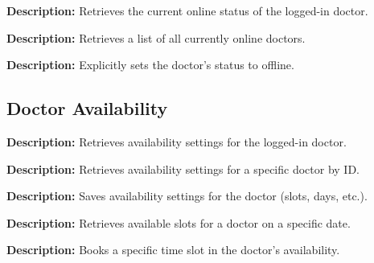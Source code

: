 \documentclass{article}
\begin{document}
\begin{tcolorbox}[title=\textcolor{accent}{GET} /api/doctor-status/status]
\textbf{Description:} Retrieves the current online status of the logged-in doctor.
\end{tcolorbox}

\begin{tcolorbox}[title=\textcolor{accent}{GET} /api/doctor-status/online-doctors]
\textbf{Description:} Retrieves a list of all currently online doctors.
\end{tcolorbox}

\begin{tcolorbox}[title=\textcolor{accent}{POST} /api/doctor-status/set-offline]
\textbf{Description:} Explicitly sets the doctor's status to offline.
\end{tcolorbox}

\subsection{Doctor Availability}

\begin{tcolorbox}[title=\textcolor{accent}{GET} /api/availability/doctor/current]
\textbf{Description:} Retrieves availability settings for the logged-in doctor.
\end{tcolorbox}

\begin{tcolorbox}[title=\textcolor{accent}{GET} /api/availability/doctor/:doctorId]
\textbf{Description:} Retrieves availability settings for a specific doctor by ID.
\end{tcolorbox}

\begin{tcolorbox}[title=\textcolor{accent}{POST} /api/availability/save]
\textbf{Description:} Saves availability settings for the doctor (slots, days, etc.).
\end{tcolorbox}

\begin{tcolorbox}[title=\textcolor{accent}{GET} /api/availability/slots/:doctorId/:date]
\textbf{Description:} Retrieves available slots for a doctor on a specific date.
\end{tcolorbox}

\begin{tcolorbox}[title=\textcolor{accent}{POST} /api/availability/book-slot]
\textbf{Description:} Books a specific time slot in the doctor's availability.
\end{tcolorbox}
\end{document}
